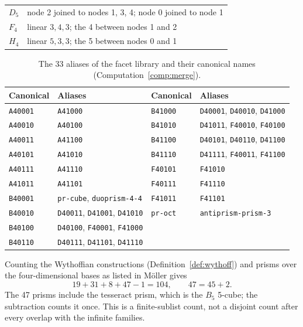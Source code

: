 \documentclass[11pt]{article}
\theoremstyle{definition}
\theoremstyle{remark}
\begin{document}
\begin{appendices}
\begin{table}[ht]
\begin{tabular}{@{}ll@{}}
$D_5$ & node 2 joined to nodes 1, 3, 4; node 0 joined to node 1\\
$F_4$ & linear $3,4,3$; the 4 between nodes 1 and 2\\
$H_4$ & linear $5,3,3$; the 5 between nodes 0 and 1\\
\bottomrule
\end{tabular}
\end{table}
\begin{table}[ht]
\centering\small
\caption{The 33 aliases of the facet library and their canonical names
(Computation~\ref{comp:merge}).}\label{tab:aliases}
\begin{tabular}{@{}ll@{\qquad}ll@{}}
\toprule
Canonical & Aliases & Canonical & Aliases\\
\midrule
\texttt{A40001} & \texttt{A41000} & \texttt{B41000} & \texttt{D40001}, \texttt{D40010}, \texttt{D41000}\\
\texttt{A40010} & \texttt{A40100} & \texttt{B41010} & \texttt{D41011}, \texttt{F40010}, \texttt{F40100}\\
\texttt{A40011} & \texttt{A41100} & \texttt{B41100} & \texttt{D40101}, \texttt{D40110}, \texttt{D41100}\\
\texttt{A40101} & \texttt{A41010} & \texttt{B41110} & \texttt{D41111}, \texttt{F40011}, \texttt{F41100}\\
\texttt{A40111} & \texttt{A41110} & \texttt{F40101} & \texttt{F41010}\\
\texttt{A41011} & \texttt{A41101} & \texttt{F40111} & \texttt{F41110}\\
\texttt{B40001} & \texttt{pr-cube}, \texttt{duoprism-4-4} & \texttt{F41011} & \texttt{F41101}\\
\texttt{B40010} & \texttt{D40011}, \texttt{D41001}, \texttt{D41010} & \texttt{pr-oct} & \texttt{antiprism-prism-3}\\
\texttt{B40100} & \texttt{D40100}, \texttt{F40001}, \texttt{F41000} & & \\
\texttt{B40110} & \texttt{D40111}, \texttt{D41101}, \texttt{D41110} & & \\
\bottomrule
\end{tabular}
\end{table}
Counting the Wythoffian constructions (Definition~\ref{def:wythoff}) and prisms over the four-dimensional bases as listed in Möller \cite[Sections 1.2 and 9.1; Table 8.7, pp.~113--114]{Moller2004thesis} gives
\[
19+31+8+47-1=104,\qquad 47=45+2.
\]
The 47 prisms include the tesseract prism, which is the $B_5$ 5-cube; the subtraction counts it once. This is a finite-sublist count, not a disjoint count after every overlap with the infinite families.

\end{appendices}
\end{document}
